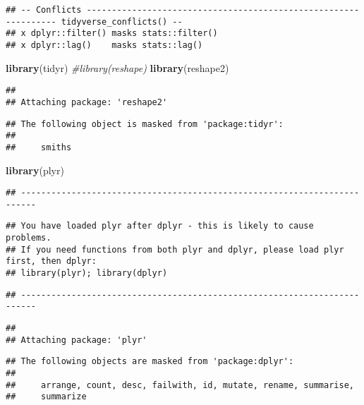 \documentclass[]{article}
\newenvironment{Shaded}{\begin{snugshade}}{\end{snugshade}}
\newcommand{\KeywordTok}[1]{\textcolor[rgb]{0.13,0.29,0.53}{\textbf{#1}}}
\newcommand{\CommentTok}[1]{\textcolor[rgb]{0.56,0.35,0.01}{\textit{#1}}}
\newcommand{\NormalTok}[1]{#1}
\begin{document}
\begin{verbatim}
## -- Conflicts ---------------------------------------------------------------- tidyverse_conflicts() --
## x dplyr::filter() masks stats::filter()
## x dplyr::lag()    masks stats::lag()
\end{verbatim}

\begin{Shaded}
\begin{Highlighting}[]
\KeywordTok{library}\NormalTok{(tidyr)}
\CommentTok{#library(reshape)}
\KeywordTok{library}\NormalTok{(reshape2)}
\end{Highlighting}
\end{Shaded}

\begin{verbatim}
## 
## Attaching package: 'reshape2'
\end{verbatim}

\begin{verbatim}
## The following object is masked from 'package:tidyr':
## 
##     smiths
\end{verbatim}

\begin{Shaded}
\begin{Highlighting}[]
\KeywordTok{library}\NormalTok{(plyr)}
\end{Highlighting}
\end{Shaded}

\begin{verbatim}
## -------------------------------------------------------------------------
\end{verbatim}

\begin{verbatim}
## You have loaded plyr after dplyr - this is likely to cause problems.
## If you need functions from both plyr and dplyr, please load plyr first, then dplyr:
## library(plyr); library(dplyr)
\end{verbatim}

\begin{verbatim}
## -------------------------------------------------------------------------
\end{verbatim}

\begin{verbatim}
## 
## Attaching package: 'plyr'
\end{verbatim}

\begin{verbatim}
## The following objects are masked from 'package:dplyr':
## 
##     arrange, count, desc, failwith, id, mutate, rename, summarise,
##     summarize
\end{verbatim}
\end{document}

